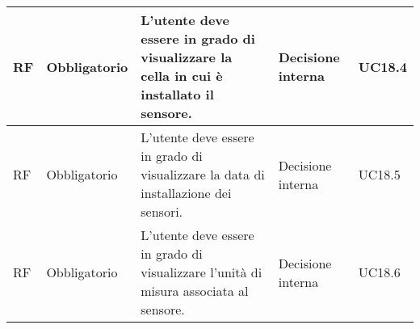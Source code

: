 \begin{longtable}{|C{1.5cm}|C{2cm}|L{5cm}|C{2cm}|C{1.5cm}|}
    \hline
     RF & Obbligatorio & L'utente deve essere in grado di visualizzare la cella in cui è installato il sensore. & Decisione interna & UC18.4 \\

    \hline
     RF & Obbligatorio & L'utente deve essere in grado di visualizzare la data di installazione dei sensori. & Decisione interna & UC18.5 \\

    \hline
     RF & Obbligatorio & L'utente deve essere in grado di visualizzare l'unità di misura associata al sensore. & Decisione interna & UC18.6 \\
    
    \hline
    
\end{longtable}

